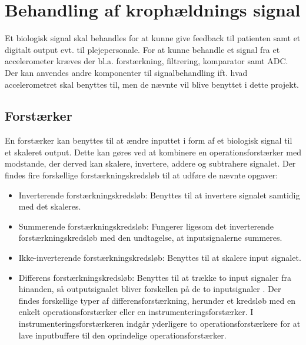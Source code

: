 \section{Behandling af krophældnings signal}
Et biologisk signal skal behandles for at kunne give feedback til patienten samt et digitalt output evt. til plejepersonale. For at kunne behandle et signal fra et accelerometer kræves der bl.a. forstærkning, filtrering, komparator samt ADC. Der kan anvendes andre komponenter til signalbehandling ift. hvad accelerometret skal benyttes til, men de nævnte vil blive benyttet i dette projekt. 

\subsection{Forstærker}\label{forstaerkerafsnit}
En forstærker kan benyttes til at ændre inputtet i form af et biologisk signal til et skaleret output. Dette kan gøres ved at kombinere en operationsforstærker med modstande, der derved kan skalere, invertere, addere og subtrahere signalet. Der findes fire forskellige forstærkningskredsløb til at udføre de nævnte opgaver: \cite{Nilsson2011}
\begin{itemize}
\item Inverterende forstærkningskredsløb: Benyttes til at invertere signalet samtidig med det skaleres.%
\item Summerende forstærkningskredsløb: Fungerer ligesom det inverterende forstærkningskredsløb med den undtagelse, at inputsignalerne summeres.
\item Ikke-inverterende forstærkningskredsløb: Benyttes til at skalere input signalet.
\item Differens forstærkningskredsløb: Benyttes til at trække to input signaler fra hinanden, så outputsignalet bliver forskellen på de to inputsignaler \cite{Nilsson2011}. Der findes forskellige typer af differensforstærkning, herunder et kredsløb med en enkelt operationsforstærker eller en instrumenteringsforstærker. I instrumenteringsforstærkeren indgår yderligere to operationsforstærkere for at lave inputbuffere til den oprindelige operationsforstærker. \cite{Sedra2010}  
\end{itemize} 

